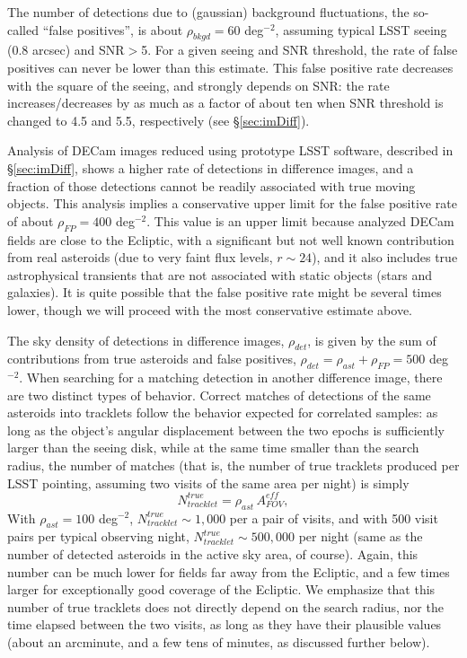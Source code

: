 The number of detections due to (gaussian) background fluctuations, the so-called ``false 
positives'', is about $\rho_{bkgd} = 60$ deg$^{-2}$, assuming typical LSST seeing (0.8 arcsec) 
and SNR$>$5. For a given seeing and SNR threshold, the rate of false positives can never be 
lower than this estimate. This false positive rate decreases with the square of the seeing, and 
strongly depends on SNR: the rate increases/decreases by as much as a factor of about ten 
when SNR threshold is changed to 4.5 and 5.5, respectively (see \S\ref{sec:imDiff}). 

Analysis of DECam images reduced using prototype LSST software, described in \S\ref{sec:imDiff},  
shows a higher rate of detections in difference images, and a fraction of those detections 
cannot be readily associated with true moving objects. This analysis implies a conservative 
upper limit for the false positive rate of about $\rho_{FP} =  400$ deg$^{-2}$. This value 
is an upper limit because analyzed DECam fields are close to the Ecliptic, with a significant but
not well known contribution from real asteroids (due to very faint flux levels, $r \sim 24$),
and it also includes true astrophysical transients that are not associated with static objects
(stars and galaxies). It is quite possible that the false positive rate might be several
times lower, though we will proceed with the most conservative estimate above. 

The sky density of detections in difference images, $\rho_{det}$, is given by 
the sum of contributions from true asteroids and false positives, $\rho_{det} = \rho_{ast} + \rho_{FP}
= 500$ deg$^{-2}$. When searching for a matching detection in another difference image, there are
two distinct types of behavior. Correct matches of detections of the same asteroids into tracklets follow the behavior 
expected for correlated samples: as long as the object's angular displacement between the two epochs 
is sufficiently larger than the seeing disk, while at the same time smaller than the search radius, the
number of matches (that is, the number of true tracklets produced per LSST pointing, assuming 
two visits of the same area per night) is simply 
\begin{equation}
                  N_{tracklet}^{true} = \rho_{ast}  \, A_{FOV}^{eff},
\end{equation}
With  $\rho_{ast} = 100$ deg$^{-2}$, $N_{tracklet}^{true} \sim 1,000$ per a pair of visits, and with
500 visit pairs per typical observing night, $N_{tracklet}^{true} \sim 500,000$ per night (same as 
the number of detected asteroids in the active sky area, of course). Again,
this number can be much lower for fields far away from the Ecliptic, and a few times larger
for exceptionally good coverage of the Ecliptic. We emphasize that this number of true tracklets 
does not directly depend on the search radius, nor the time elapsed between the two visits, as long 
as they have their plausible values (about an arcminute, and a few tens of minutes, as discussed 
further below). 


